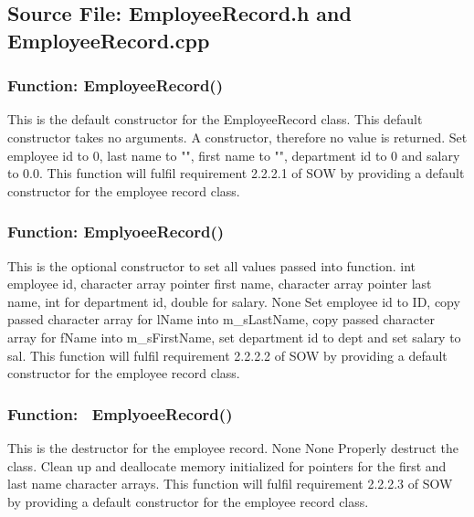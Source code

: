 \documentclass[12pt]{article}%
\newcounter{subsubsubsection}[subsubsection]
\begin{document}
\subsection{Source File: EmployeeRecord.h and EmployeeRecord.cpp}
\subsubsection{Function: EmployeeRecord()}
This is the default constructor for the EmployeeRecord class.
This default constructor takes no arguments.
A constructor, therefore no value is returned.
Set employee id to 0, last name to "", first name to "", department id to 0 and salary to 0.0.
This function will fulfil requirement 2.2.2.1 of SOW by providing a default constructor for the
employee record class.

\subsubsection{Function: EmplyoeeRecord()}
This is the optional constructor to set all values passed into function.
int employee id, character array pointer first name, character array pointer last name, int for
department id, double for salary.
None
Set employee id to ID, copy passed character array for lName into m_sLastName, copy passed character array for fName into m_sFirstName, set department id to dept and set salary to sal.
This function will fulfil requirement 2.2.2.2 of SOW by providing a default constructor for the
employee record class.

\subsubsection{Function: ~EmplyoeeRecord()}
This is the destructor for the employee record.
None
None
Properly destruct the class. Clean up and deallocate memory initialized for pointers for the first and last name
character arrays.
This function will fulfil requirement 2.2.2.3 of SOW by providing a default constructor for the
employee record class.
\end{document}
